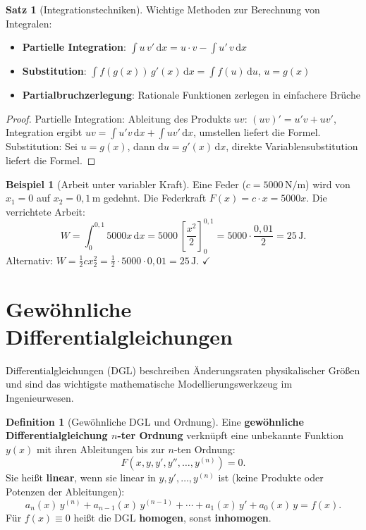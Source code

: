﻿\documentclass[a4paper,12pt]{report}
\theoremstyle{definition}
\newtheorem{definition}{Definition}
\newtheorem{beispiel}{Beispiel}
\newtheorem{satz}{Satz}
\begin{document}
\begin{satz}[Integrationstechniken]
Wichtige Methoden zur Berechnung von Integralen:
\begin{itemize}
    \item[-] \textbf{Partielle Integration}: $\int u\,v'\,\mathrm{d}x = u\cdot v - \int u'\,v\,\mathrm{d}x$
    \item[-] \textbf{Substitution}: $\int f(g(x))\,g'(x)\,\mathrm{d}x = \int f(u)\,\mathrm{d}u$, $u = g(x)$
    \item[-] \textbf{Partialbruchzerlegung}: Rationale Funktionen zerlegen in einfachere Br\"uche
\end{itemize}
\end{satz}
\begin{proof}
Partielle Integration: Ableitung des Produkts $uv$: $(uv)' = u'v + uv'$,
Integration ergibt $uv = \int u'v\,\mathrm{d}x + \int uv'\,\mathrm{d}x$,
umstellen liefert die Formel.
Substitution: Sei $u = g(x)$, dann $\mathrm{d}u = g'(x)\,\mathrm{d}x$,
direkte Variablensubstitution liefert die Formel.
\end{proof}

\begin{beispiel}[Arbeit unter variabler Kraft]
Eine Feder ($c = 5000\,\mathrm{N/m}$) wird von $x_1 = 0$ auf $x_2 = 0{,}1\,\mathrm{m}$
gedehnt. Die Federkraft $F(x) = c\cdot x = 5000x$. Die verrichtete Arbeit:
\[
  W = \int_0^{0{,}1} 5000x\,\mathrm{d}x = 5000\,\left[\frac{x^2}{2}\right]_0^{0{,}1}
    = 5000 \cdot \frac{0{,}01}{2} = 25\,\mathrm{J}.
\]
Alternativ: $W = \tfrac{1}{2}c x_2^2 = \tfrac{1}{2}\cdot 5000\cdot 0{,}01 = 25\,\mathrm{J}$. $\checkmark$
\end{beispiel}

\section{Gew\"ohnliche Differentialgleichungen}

Differentialgleichungen (DGL) beschreiben \"Anderungsraten physikalischer
Gr\"o\ss{}en und sind das wichtigste mathematische Modellierungswerkzeug
im Ingenieurwesen.

\begin{definition}[Gew\"ohnliche DGL und Ordnung]
Eine \textbf{gew\"ohnliche Differentialgleichung $n$-ter Ordnung} verkn\"upft
eine unbekannte Funktion $y(x)$ mit ihren Ableitungen bis zur $n$-ten Ordnung:
\[
  F(x, y, y', y'', \ldots, y^{(n)}) = 0.
\]
Sie hei\ss{}t \textbf{linear}, wenn sie linear in $y, y', \ldots, y^{(n)}$
ist (keine Produkte oder Potenzen der Ableitungen):
\[
  a_n(x)\,y^{(n)} + a_{n-1}(x)\,y^{(n-1)} + \cdots + a_1(x)\,y' + a_0(x)\,y = f(x).
\]
F\"ur $f(x) \equiv 0$ hei\ss{}t die DGL \textbf{homogen}, sonst \textbf{inhomogen}.
\end{definition}
\end{document}
